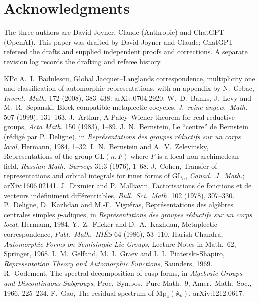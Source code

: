\documentclass[12pt]{article}
\newcommand{\A}{\mathbb{A}}
\newcommand{\GL}{\mathrm{GL}}
\theoremstyle{plain}
\theoremstyle{definition}
\begin{document}
\section*{Acknowledgments}
The three authors are David Joyner, Claude (Anthropic) and ChatGPT (OpenAI). This paper was drafted by David Joyner and Claude; ChatGPT refereed the drafts and supplied independent proofs and corrections. A separate revision log records the drafting and referee history.

\begin{thebibliography}{KPc}\small
{} A.~I.~Badulescu, Global Jacquet--Langlands correspondence, multiplicity one and classification of automorphic representations, with an appendix by N.~Grbac, \emph{Invent.\ Math.} 172 (2008), 383--438; arXiv:0704.2920.
 W.~D.~Banks, J.~Levy and M.~R.~Sepanski, Block-compatible metaplectic cocycles, \emph{J.\ reine angew.\ Math.} 507 (1999), 131--163.
 J.~Arthur, A Paley--Wiener theorem for real reductive groups, \emph{Acta Math.} 150 (1983), 1--89.
 J.~N.~Bernstein, Le ``centre'' de Bernstein (r\'edig\'e par P.~Deligne), in \emph{Repr\'esentations des groupes r\'eductifs sur un corps local}, Hermann, 1984, 1--32.
 I.~N.~Bernstein and A.~V.~Zelevinsky, Representations of the group $\GL(n,F)$ where $F$ is a local non-archimedean field, \emph{Russian Math.\ Surveys} 31:3 (1976), 1--68.
 J.~Cohen, Transfer of representations and orbital integrals for inner forms of $\GL_n$, \emph{Canad.\ J.\ Math.}; arXiv:1606.02141.
 J.~Dixmier and P.~Malliavin, Factorisations de fonctions et de vecteurs ind\'efiniment diff\'erentiables, \emph{Bull.\ Sci.\ Math.} 102 (1978), 307--330.
 P.~Deligne, D.~Kazhdan and M.-F.~Vign\'eras, Repr\'esentations des alg\`ebres centrales simples $p$-adiques, in \emph{Repr\'esentations des groupes r\'eductifs sur un corps local}, Hermann, 1984.
 Y.~Z.~Flicker and D.~A.~Kazhdan, Metaplectic correspondence, \emph{Publ.\ Math.\ IH\'ES} 64 (1986), 53--110.
 Harish-Chandra, \emph{Automorphic Forms on Semisimple Lie Groups}, Lecture Notes in Math.\ 62, Springer, 1968.
 I.~M.~Gelfand, M.~I.~Graev and I.~I.~Piatetski-Shapiro, \emph{Representation Theory and Automorphic Functions}, Saunders, 1969.
 R.~Godement, The spectral decomposition of cusp-forms, in \emph{Algebraic Groups and Discontinuous Subgroups}, Proc.\ Sympos.\ Pure Math.\ 9, Amer.\ Math.\ Soc., 1966, 225--234.
 F.~Gao, The residual spectrum of $\mathrm{Mp}_4(\A_k)$, arXiv:1212.0617.

\end{thebibliography}
\end{document}
